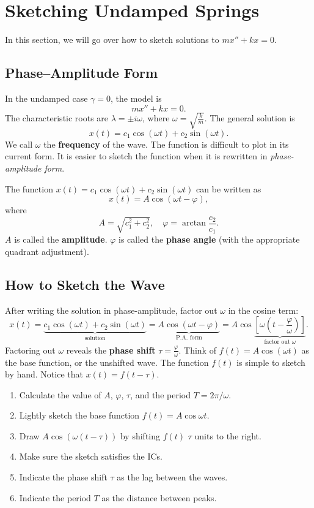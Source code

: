 \documentclass[10pt,letterpaper]{article}
\begin{document}

\section{Sketching Undamped Springs}
In this section, we will go over how to sketch solutions to $mx''+kx=0$.

\subsection{Phase--Amplitude Form}
In the undamped case $\gamma=0$, the model is
\[
m x'' + kx = 0.
\]
The characteristic roots are $\lambda=\pm i\omega$, where $\omega=\sqrt{\frac{k}{m}}$. The general solution is
\[
x(t)=c_1\cos(\omega t)+c_2\sin(\omega t).
\]
We call $\omega$ the \textbf{frequency} of the wave. The function is difficult to plot in its current form. It is easier to sketch the function when it is rewritten in \textit{phase-amplitude form}. 

\begin{theorem}
The function $x(t)=c_1\cos(\omega t)+c_2\sin(\omega t)$ can be written as
$$
x(t) = A \cos(\omega t-\varphi),
$$
where 
$$
A = \sqrt{c_1^2+c_2^2}, \quad \varphi = \arctan\frac{c_2}{c_1}.
$$
$A$ is called the \textbf{amplitude}. $\varphi$ is called the \textbf{phase angle} (with the appropriate quadrant adjustment).
\end{theorem}




\subsection{How to Sketch the Wave}
After writing the solution in phase-amplitude, factor out $\omega$ in the cosine term:
$$
x(t)=\underbrace{c_1\cos(\omega t)+c_2\sin(\omega t) }_{\text{solution}}=  \underbrace{A \cos(\omega t-\varphi)}_{\text{P.A. form}} = A \cos\underbrace{\left[\omega(t-\frac{\varphi}{\omega})\right]}_{\text{factor out }\omega}. 
$$
Factoring out $\omega$ reveals the \textbf{phase shift} $\tau=\frac\varphi\omega$. Think of $f(t)= A\cos(\omega t)$ as the base function, or the unshifted wave. The function $f(t)$ is simple to sketch by hand. Notice that $x(t) = f(t-\tau)$.  
\begin{enumerate}
    \item Calculate the value of $A$, $\varphi$, $\tau$, and the period $T=2\pi/\omega$.
    \item Lightly sketch the base function  $f(t)=A \cos\omega t$.
    \item Draw $A\cos(\omega(t-\tau))$ by shifting $f(t)$ $\tau$ units to the right.
    \item Make sure the sketch satisfies the ICs.
    \item Indicate the phase shift $\tau$ as the lag between the waves.
    \item Indicate the period $T$ as the distance between peaks.
\end{enumerate}
\end{document}
